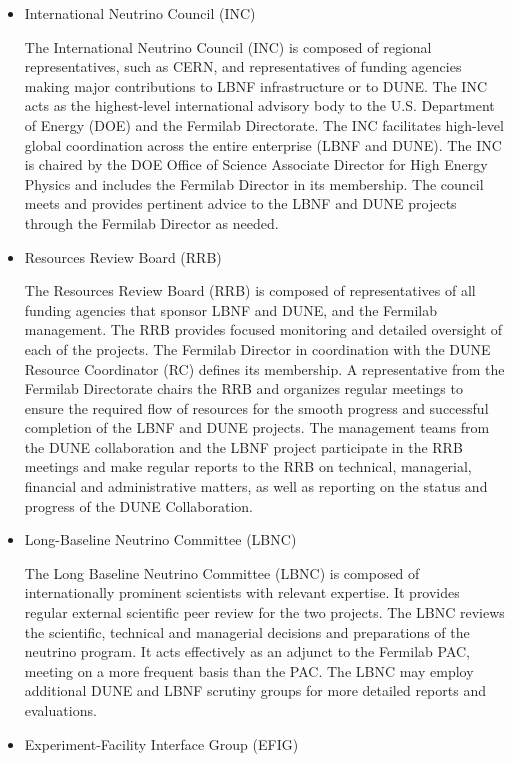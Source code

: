 \begin{itemize}
\item International Neutrino Council (INC)

The International Neutrino Council (INC) is composed of regional representatives, such as CERN, and representatives of funding agencies making major contributions to LBNF infrastructure or to DUNE. The INC acts as the highest-level international advisory body to the U.S. Department of Energy (DOE) and the Fermilab Directorate. The INC facilitates high-level global coordination across the entire enterprise (LBNF and DUNE). The INC is chaired by the DOE Office of Science Associate Director for High Energy Physics and includes the Fermilab Director in its membership. The council meets and provides pertinent advice to the LBNF and DUNE projects through the Fermilab Director as needed.
\item Resources Review Board (RRB)

The Resources Review Board (RRB) is composed of representatives of all funding agencies that sponsor LBNF and DUNE, and the Fermilab management. The RRB provides focused monitoring and detailed oversight of each of the projects. The Fermilab Director in coordination with the DUNE Resource Coordinator (RC) defines its membership. A representative from the Fermilab Directorate chairs the RRB and organizes regular meetings to ensure the required flow of resources for the smooth progress and successful completion of the LBNF and DUNE projects. The management teams from the DUNE collaboration and the LBNF project participate in the RRB meetings and make regular reports to the RRB on technical, managerial, financial and administrative matters, as well as reporting on the status and progress of the DUNE Collaboration.

\item Long-Baseline Neutrino Committee (LBNC)

The Long Baseline Neutrino Committee (LBNC) is composed of internationally prominent scientists with relevant expertise. It provides regular external scientific peer review for the two projects. The LBNC reviews the scientific, technical and managerial decisions and preparations of the neutrino program. It acts effectively as an adjunct to the Fermilab PAC, meeting on a more frequent basis than the PAC. The LBNC may employ additional DUNE and LBNF scrutiny groups for more detailed reports and evaluations. 

\item Experiment-Facility Interface Group (EFIG)


\end{itemize}
